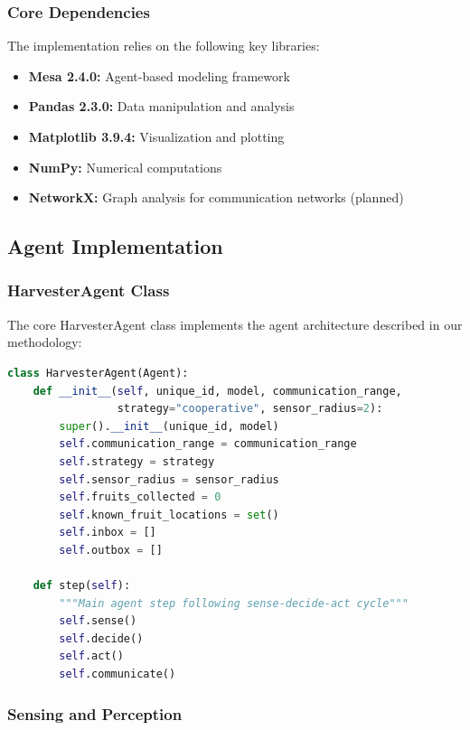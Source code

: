 \documentclass[12pt,a4paper]{article}
\begin{document}
\subsubsection{Core Dependencies}

The implementation relies on the following key libraries:

\begin{itemize}
    \item \textbf{Mesa 2.4.0:} Agent-based modeling framework
    \item \textbf{Pandas 2.3.0:} Data manipulation and analysis
    \item \textbf{Matplotlib 3.9.4:} Visualization and plotting
    \item \textbf{NumPy:} Numerical computations
    \item \textbf{NetworkX:} Graph analysis for communication networks (planned)
\end{itemize}

\subsection{Agent Implementation}

\subsubsection{HarvesterAgent Class}

The core HarvesterAgent class implements the agent architecture described in our methodology:

\begin{lstlisting}[language=Python, caption=HarvesterAgent Core Structure]
class HarvesterAgent(Agent):
    def __init__(self, unique_id, model, communication_range,
                 strategy="cooperative", sensor_radius=2):
        super().__init__(unique_id, model)
        self.communication_range = communication_range
        self.strategy = strategy
        self.sensor_radius = sensor_radius
        self.fruits_collected = 0
        self.known_fruit_locations = set()
        self.inbox = []
        self.outbox = []

    def step(self):
        """Main agent step following sense-decide-act cycle"""
        self.sense()
        self.decide()
        self.act()
        self.communicate()
\end{lstlisting}

\subsubsection{Sensing and Perception}
\end{document}
